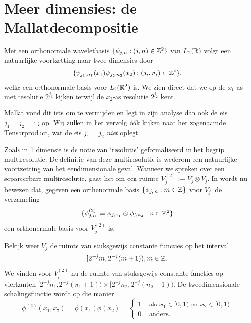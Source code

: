 \section{Meer dimensies: de Mallatdecompositie}
Met een orthonormale waveletbasis $\{ \psi_{j,n}: (j,n) \in \mathbb{Z}^2\}$ van $L_2(\mathbb{R})$ volgt een natuurlijke voortzetting naar twee dimensies door
\[
\{ \psi_{j_1,n_1}(x_1) \psi_{j_2,n_2}(x_2): (j_i,n_i) \in \mathbb{Z}^4 \},
\]
welke een orthonormale basis voor $L_2(\mathbb{R}^2)$ is. We zien direct dat we op de $x_1$-as met resolutie $2^{j_1}$ kijken terwijl de $x_2$-as resolutie $2^{j_2}$ kent.

Mallat vond dit iets om te vermijden \cite[\S 7.7]{mallat} en legt in zijn analyse dan ook de eis $j_1 = j_2 =: j$ op. Wij zullen in het vervolg \'o\'ok kijken naar het zogenaamde Tensorproduct, wat de eis $j_1 = j_2$ \emph{niet} oplegt.

Zoals in 1 dimensie is de notie van `resolutie' geformaliseerd in het begrip multiresolutie. De definitie van deze multiresolutie is wederom een natuurlijke voortzetting van het eendimensionale geval. Wanneer we spreken over een separeerbare multiresolutie, gaat het om een ruimte $V_j^{(2)} := V_j \otimes V_j$. In \cite[A.5]{mallat} wordt nu bewezen dat, gegeven een orthonormale basis $\{ \phi_{j,m}: m \in \mathbb{Z} \}$ voor $V_j$, de verzameling
\begin{equation}
  \label{phi_phi_basis}
  \{ \phi^{(2)}_{j,n} := \phi_{j,n_1} \otimes \phi_{j,n_2}: n \in \mathbb{Z}^2 \}
\end{equation}
een orthonormale basis voor $V_j^{(2)}$ is.

\begin{voorbeeld}
Bekijk weer $V_j$ de ruimte van stuksgewijs constante functies op het interval 
\[
 [2^{-j} m, 2^{-j}(m+1) ), m \in \mathbb{Z}.
\] 
We vinden voor $V_j^{(2)}$ nu de ruimte van stuksgewijs constante functies op vierkanten $[2^{-j}n_1, 2^{-j}(n_1+1)) \times [2^{-j}n_2, 2^{-j}(n_2+1))$. De tweedimensionale schalingsfunctie wordt op die manier
\[
	\phi^{(2)}(x_1,x_2) = \phi(x_1)\phi(x_2) = \begin{cases} 1 & \text{ als } x_1 \in [0,1)\text{ en }x_2 \in [0,1) \\ 0 & \text{ anders.} \end{cases}
\]
\end{voorbeeld}


